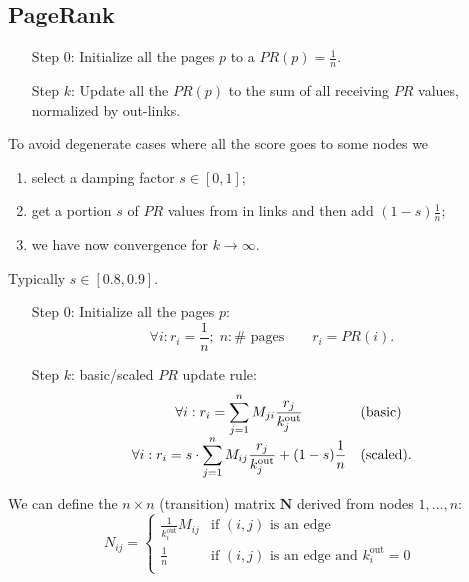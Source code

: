 \documentclass[a4paper,9pt]{extarticle}
\begin{document}
\begin{multicols*}{2}
		\subsection{PageRank}
		\begin{enumerate}
			\item[Step 0:] Initialize all the pages $p$ to a $PR(p)=\frac{1}{n}$.
			\item[Step $k$:] Update all the $PR(p)$ to the sum of all receiving $PR$ values, normalized by out-links.  
		\end{enumerate}
		To avoid degenerate cases where all the score goes to some nodes we
		\begin{enumerate}
			\item select a damping factor $s\in[0,1]$;
			\item get a portion $s$ of $PR$ values from in links and then add $(1-s)\frac{1}{n}$;
			\item we have now convergence for $k\to\infty$.
		\end{enumerate}
		Typically $s\in[0.8,0.9]$.
		\begin{riquadro}
				\begin{enumerate}
				\item[Step 0:] Initialize all the pages $p$:
				\begin{equation*}
					\forall i: r_{i}=\frac{1}{n};\; n:\#\text{ pages}\qquad r_{i}=PR(i).
				\end{equation*}
				\item[Step $k$:] basic/scaled $PR$ update rule:
				\begin{equation*}
					\begin{array}{>{\displaystyle}cl}
						\forall i:r_{i}=\sum_{j=1}^{n}M_{ji}\frac{r_{j}}{k_{j}^{\mathrm{out}}}&\text{(basic)}\\
						\forall i:r_{i}=s\cdot\sum_{j=1}^{n}M_{ij}\frac{r_{j}}{k_{j}^{\mathrm{out}}}+(1-s)\frac{1}{n}&\text{(scaled)}.
					\end{array}
				\end{equation*} 
			\end{enumerate}
		\end{riquadro}
		We can define the $n\times n$ (transition) matrix $\mathbf{N}$ derived from nodes $1,\ldots,n$:
		\begin{equation*}
			N_{ij}=\begin{cases}
				\frac{1}{k_{i}^{\mathrm{out}}}M_{ij}&\text{if $(i,j)$ is an edge}\\
				\frac{1}{n}&\text{if $(i,j)$ is an edge and $k_{i}^{\mathrm{out}}=0$}\\

\end{cases}
\end{equation*}
\end{multicols*}
\end{document}

